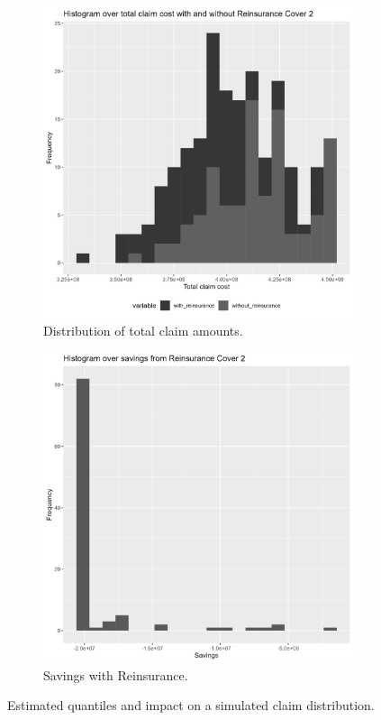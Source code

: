 \documentclass[11pt]{article}
\begin{document}
 \begin{figure}[!h]
\centering
    \begin{subfigure}{.49\textwidth}
      \centering
      \includegraphics[width=.9\linewidth]{plots/reinsurance2/histogram_total_claim_cost_with_reinsurance.png}
      \caption{Distribution of total claim amounts.}
    \end{subfigure}
    \begin{subfigure}{.49\textwidth}
      \centering
      \includegraphics[width=.9\linewidth]{plots/reinsurance2/histogram_savings.png}
      \caption{Savings with Reinsurance.}
    \end{subfigure}
    \caption{Estimated quantiles and impact on a simulated claim distribution.}
    \label{a6:claim_cost}
\end{figure}
\end{document}
